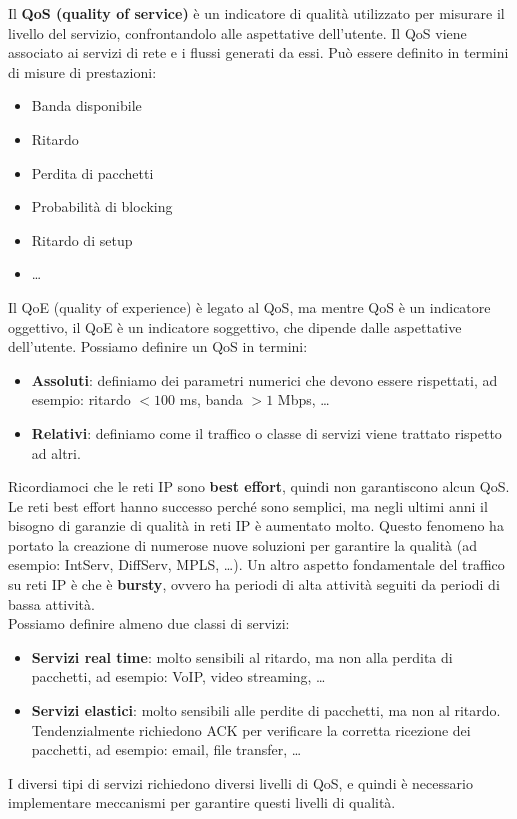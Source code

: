 Il \textbf{QoS (quality of service)} è un indicatore di qualità utilizzato per misurare il livello del servizio, confrontandolo alle aspettative dell'utente.
Il QoS viene associato ai servizi di rete e i flussi generati da essi.
Può essere definito in termini di misure di prestazioni:
\begin{itemize}
	\item Banda disponibile
	\item Ritardo
	\item Perdita di pacchetti
	\item Probabilità di blocking
	\item Ritardo di setup
	\item \ldots
\end{itemize}
Il QoE (quality of experience) è legato al QoS, ma mentre QoS è un indicatore oggettivo, il QoE è un indicatore soggettivo, che dipende dalle aspettative dell'utente.
Possiamo definire un QoS in termini:
\begin{itemize}
	\item \textbf{Assoluti}: definiamo dei parametri numerici che devono essere rispettati, ad esempio: ritardo $< 100$ ms, banda $> 1$ Mbps, \ldots
	\item \textbf{Relativi}: definiamo come il traffico o classe di servizi viene trattato rispetto ad altri.
\end{itemize}
Ricordiamoci che le reti IP sono \textbf{best effort}, quindi non garantiscono alcun QoS.
Le reti best effort hanno successo perché sono semplici, ma negli ultimi anni il bisogno di garanzie di qualità in reti IP è aumentato molto. 
Questo fenomeno ha portato la creazione di numerose nuove soluzioni per garantire la qualità (ad esempio: IntServ, DiffServ, MPLS, \ldots).
Un altro aspetto fondamentale del traffico su reti IP è che è \textbf{bursty}, ovvero ha periodi di alta attività seguiti da periodi di bassa attività.
\\
Possiamo definire almeno due classi di servizi:
\begin{itemize}
	\item \textbf{Servizi real time}: molto sensibili al ritardo, ma non alla perdita di pacchetti, ad esempio: VoIP, video streaming, \ldots
	\item \textbf{Servizi elastici}: molto sensibili alle perdite di pacchetti, ma non al ritardo. Tendenzialmente richiedono ACK per verificare la corretta ricezione dei pacchetti, ad esempio: email, file transfer, \ldots
\end{itemize}
I diversi tipi di servizi richiedono diversi livelli di QoS, e quindi è necessario implementare meccanismi per garantire questi livelli di qualità.

